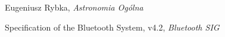 \begin{thebibliography}{9}

 Eugeniusz Rybka, \emph{Astronomia Ogólna}

 Specification of the Bluetooth System, v4.2,
	\emph{Bluetooth SIG}

\end{thebibliography}
